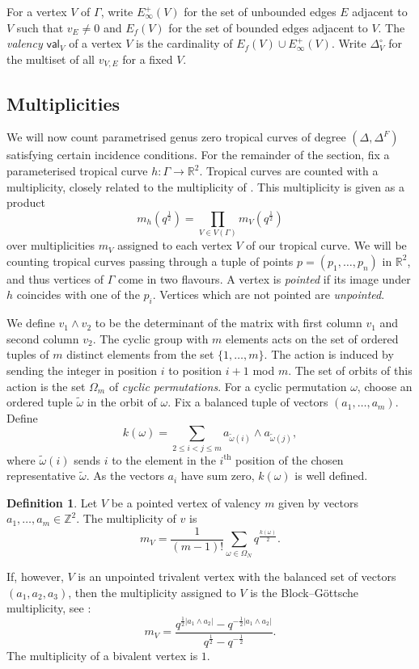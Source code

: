 \documentclass[11pt]{amsart}
\numberwithin{equation}{section}
\theoremstyle{plain}
\theoremstyle{remark}
\theoremstyle{definition}
\newtheorem{definition}[theorem]{Definition}
\newcommand{\ZZ}{\mathbb{Z}}
\newcommand{\supth}[1]{\ensuremath{#1^{\mathrm{th}}}}
\begin{document}
For a vertex $V$ of $\Gamma$, write $E_\infty^+(V)$ for the set of unbounded edges $E$ adjacent to $V$ such that $v_E\ne 0$ and $E_f(V)$ for the set of bounded edges adjacent to $V$. The \textit{valency} $\mathsf{val}_V$ of a vertex $V$ is the cardinality of $E_f(V)\cup E_\infty^+(V)$. Write $\Delta_V^\circ$ for the multiset of all $v_{V,E}$ for a fixed $V$.

\subsection{Multiplicities}\label{sec: multiplicities}
We will now count parametrised genus zero tropical curves of degree $(\Delta,\Delta^F)$ satisfying certain incidence conditions. For the remainder of the section, fix  a parameterised tropical curve ${h}\colon\Gamma \rightarrow \mathbb{R}^2$. Tropical curves are counted with a multiplicity, closely related to the multiplicity of \cite{blechman2019refined}. This multiplicity is given as a product
$$m_{h}\left(q^{\frac{1}{2}}\right) = \prod_{V \in V(\Gamma)}m_V\left(q^{\frac{1}{2}}\right)$$
over multiplicities $m_V$ assigned to each vertex $V$ of our tropical curve. 
We will be counting tropical curves passing through a tuple of points $p=(p_1,\ldots,p_n)$ in $\mathbb{R}^2$, and thus vertices of $\Gamma$ come in two flavours. A vertex is \textit{pointed} if its image under $h$ coincides with one of the $p_i$. Vertices which are not pointed are \textit{unpointed}.

We define $v_1\wedge v_2$ to be the determinant of the matrix with first column $v_1$ and second column $v_2$. The cyclic group with $m$ elements acts on the set of ordered tuples of $m$ distinct elements from the set $\{1,\ldots,m\}$. 
The action is induced by sending the integer in position $i$ to position $i+1$ mod $m$. The set of orbits of this action is the set $\Omega_m$ of \textit{cyclic permutations}. For a cyclic permutation $\omega$,  choose an ordered tuple $\tilde{\omega}$ in the orbit of $\omega$. Fix a balanced tuple of vectors $(a_1,\ldots,a_m)$. Define
$$k(\omega) = \sum_{2\leq i < j \leq m}a_{\tilde{\omega}(i)} \wedge a_{\tilde{\omega}(j)},$$
where $\tilde{\omega}(i)$ sends $i$ to the element in the $\supth{i}$ position of the chosen representative $\tilde{\omega}$. As the vectors $a_i$ have sum zero, $k(\omega)$ is well defined. 

\begin{definition}\label{Definition : blechman-shustin} Let $V$ be a pointed vertex of valency $m$ given by vectors $a_1,\dots,a_m \in \ZZ^2$. The multiplicity of $v$ is $$m_V = \frac{1}{(m-1)!}\sum_{\omega \in \Omega_N} q^{\frac{k(\omega)}{2}}.$$

If, however, $V$ is an unpointed trivalent vertex with the balanced set of vectors $(a_1,a_2,a_3)$, then the multiplicity assigned to $V$ is the Block--G\"ottsche multiplicity, see \cite{block2016refined}:  
\begin{equation}\label{eq : BG multiplicity}
m_V = \frac{q^{\frac{1}{2}|a_1 \wedge a_2|} - q^{-\frac{1}{2}|a_1 \wedge a_2|}}{q^{\frac{1}{2}} - q^{-\frac{1}{2}}}.
\end{equation}
The multiplicity of a bivalent vertex is $1$.
\end{definition}
\end{document}
